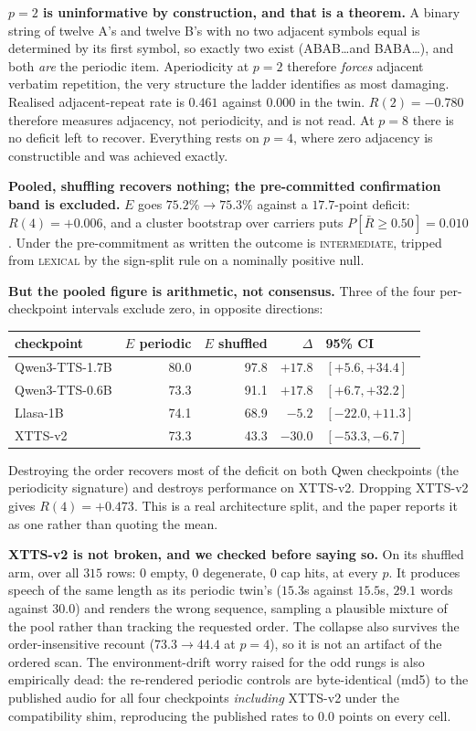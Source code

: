 \documentclass[11pt]{article}
\begin{document}
\textbf{$p{=}2$ is uninformative by construction, and that is a theorem.} A
binary string of twelve A's and twelve B's with no two adjacent symbols equal is
determined by its first symbol, so exactly two exist (ABAB\ldots and
BABA\ldots), and both \emph{are} the periodic item. Aperiodicity at $p{=}2$
therefore \emph{forces} adjacent verbatim repetition, the very structure the
ladder identifies as most damaging. Realised adjacent-repeat rate is $0.461$
against $0.000$ in the twin. $R(2)=-0.780$ therefore measures adjacency, not
periodicity, and is not read. At $p{=}8$ there is no deficit left
to recover. Everything rests on $p{=}4$, where zero adjacency is constructible
and was achieved exactly.

\textbf{Pooled, shuffling recovers nothing; the pre-committed confirmation band
is excluded.} $E$ goes $75.2\% \to 75.3\%$ against a $17.7$-point deficit:
$R(4) = +0.006$, and a cluster bootstrap over carriers puts
$P[\bar R \ge 0.50] = 0.010$. Under the pre-commitment as written the outcome is
\textsc{intermediate}, tripped from \textsc{lexical} by the sign-split rule on a
nominally positive null.

\textbf{But the pooled figure is arithmetic, not consensus.} Three of the four
per-checkpoint intervals exclude zero, in opposite directions:

\begin{center}
\begin{tabular}{@{}lrrrl@{}}
\toprule
checkpoint & $E$ periodic & $E$ shuffled & $\Delta$ & 95\% CI \\
\midrule
Qwen3-TTS-1.7B & 80.0 & 97.8 & $+17.8$ & $[+5.6, +34.4]$ \\
Qwen3-TTS-0.6B & 73.3 & 91.1 & $+17.8$ & $[+6.7, +32.2]$ \\
Llasa-1B       & 74.1 & 68.9 & $-5.2$  & $[-22.0, +11.3]$ \\
XTTS-v2        & 73.3 & 43.3 & $-30.0$ & $[-53.3, -6.7]$ \\
\bottomrule
\end{tabular}
\end{center}

\noindent Destroying the order recovers most of the deficit on both Qwen
checkpoints (the periodicity signature) and destroys performance on
XTTS-v2. Dropping XTTS-v2 gives $R(4) = +0.473$. This is a real architecture
split, and the paper reports it as one rather than quoting the mean.

\textbf{XTTS-v2 is not broken, and we checked before saying so.} On its shuffled
arm, over all $315$ rows: $0$ empty, $0$ degenerate, $0$ cap hits, at every $p$.
It produces speech of the same length as its periodic twin's ($15.3$s against
$15.5$s, $29.1$ words against $30.0$) and renders the wrong sequence, sampling a
plausible mixture of the pool rather than tracking the requested order. The
collapse also survives the order-insensitive recount ($73.3 \to 44.4$ at
$p{=}4$), so it is not an artifact of the ordered scan. The environment-drift worry raised for the odd rungs is also
empirically dead: the re-rendered periodic controls are byte-identical (md5) to
the published audio for all four checkpoints \emph{including} XTTS-v2 under the
compatibility shim, reproducing the published rates to $0.0$ points on every
cell.
\end{document}
